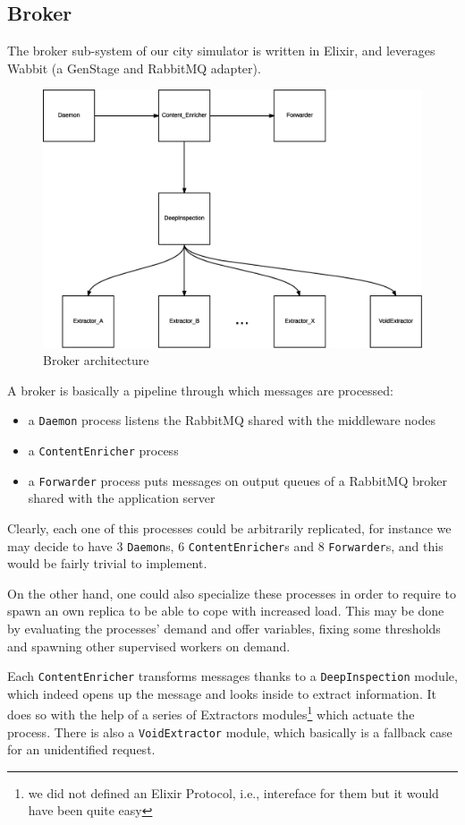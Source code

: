 \subsection{Broker}\label{sec:impl-broker}

The broker sub-system of our city simulator is written in Elixir, and leverages
Wabbit (a GenStage and RabbitMQ adapter).

\begin{figure}[H]
  \centering
  \includegraphics[width=\columnwidth]{images/implementation/broker.eps}
  \caption{Broker architecture}
  \label{fig:broker-arch}
\end{figure}

A broker is basically a pipeline through which messages are processed:

\begin{itemize}
  \item a \texttt{Daemon} process listens the RabbitMQ shared with the
    middleware nodes
  \item a \texttt{ContentEnricher} process 
  \item a \texttt{Forwarder} process puts messages on output queues of a
    RabbitMQ broker shared with the application server
\end{itemize}

Clearly, each one of this processes could be arbitrarily replicated, for
instance we may decide to have 3 \texttt{Daemon}s, 6 \texttt{ContentEnricher}s
and 8 \texttt{Forwarder}s, and this would be fairly trivial to implement.

On the other hand, one could also specialize these processes in order to
require to spawn an own replica to be able to cope with increased load. This
may be done by evaluating the processes' demand and offer variables, fixing
some thresholds and spawning other supervised workers on demand.

Each \texttt{ContentEnricher} transforms messages thanks to a
\texttt{DeepInspection} module, which indeed opens up the message and looks
inside to extract information.
It does so with the help of a series of Extractors modules\footnote{we did not
defined an Elixir Protocol, i.e., intereface for them but it would have been
quite easy} which actuate the process. There is also a \texttt{VoidExtractor}
module, which basically is a fallback case for an unidentified request.
